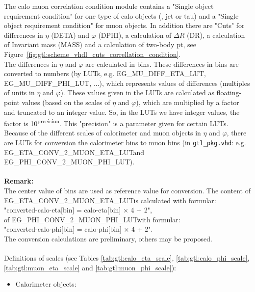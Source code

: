 The calo muon correlation condition module contains a "Single object requirement condition" for one type of calo objects (\egamma, jet or tau) and a "Single object requirement condition" for muon objects.
In addition there are "Cuts" for differences in $\eta$ (DETA) and $\varphi$ (DPHI), a calculation of $\Delta$$R$ (DR), a calculation of Invariant mass (MASS) and a calculation of two-body pt, see Figure~\ref{fig:gtl:scheme_vhdl_cuts_correllation_condition}.\\
The differences in $\eta$ and $\varphi$ are calculated in bins. These differences in bins are converted to numbers (by LUTs, e.g. \small{EG\_MU\_DIFF\_ETA\_LUT, EG\_MU\_DIFF\_PHI\_LUT}\normalsize, ...), which represents values of differences (multiples of units in $\eta$ and $\varphi$).
These values given in the LUTs are calculated as floating-point values (based on the scales of $\eta$ and $\varphi$), which are multiplied by a factor and truncated to an integer value.
So, in the LUTs we have integer values, the factor is 10\textsuperscript{\tiny{precision}\normalsize}. This "precision" is a parameter given for certain LUTs.\\
Because of the different scales of calorimeter and muon objects in $\eta$ and $\varphi$, there are LUTs for conversion the calorimeter bins to muon bins (in \texttt{gtl\_pkg.vhd}:
 e.g. \small{EG\_ETA\_CONV\_2\_MUON\_ETA\_LUT}\normalsize and \small{EG\_PHI\_CONV\_2\_MUON\_PHI\_LUT}\normalsize).\\\\
\textbf{Remark:}\\
The center value of bins are used as reference value for conversion.
The content of \small{EG\_ETA\_CONV\_2\_MUON\_ETA\_LUT}\normalsize is calculated with formular:\\ "converted-calo-eta[bin] = calo-eta[bin] $\times$ 4 + 2",\\
of \small{EG\_PHI\_CONV\_2\_MUON\_PHI\_LUT}\normalsize with formular:\\
"converted-calo-phi[bin] = calo-phi[bin] $\times$ 4 + 2".\\
The conversion calculations are preliminary, others may be proposed.\\\\
Definitions of scales (see Tables \ref{tab:gtl:calo_eta_scale}, \ref{tab:gtl:calo_phi_scale}, \ref{tab:gtl:muon_eta_scale} and \ref{tab:gtl:muon_phi_scale}):
\begin{itemize}
\item Calorimeter objects:
\begin{itemize}

\end{itemize}
\end{itemize}$$
